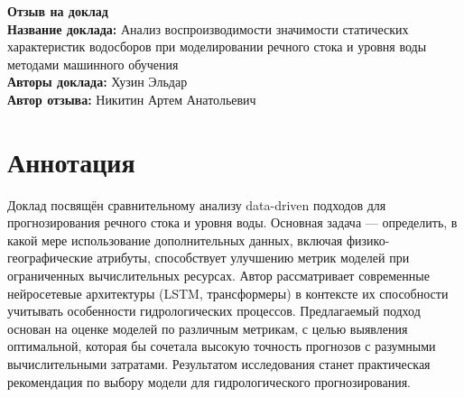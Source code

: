\documentclass[11pt]{article}
\begin{document}
\begin{center}
    {\Large \textbf{Отзыв на доклад}}\\[1em]
    {\large \textbf{Название доклада:} Анализ воспроизводимости значимости статических характеристик водосборов при моделировании речного стока и уровня воды методами машинного обучения}\\[0.5em]    {\large \textbf{Авторы доклада:} Хузин Эльдар}\\[0.5em]
    {\large \textbf{Автор отзыва:} Никитин Артем Анатольевич}\\[2em]
\end{center}

\section*{Аннотация}
Доклад посвящён сравнительному анализу data-driven подходов для прогнозирования речного стока и уровня воды. Основная задача ---
определить, в какой мере использование дополнительных данных, включая физико-географические атрибуты, способствует улучшению
метрик моделей при ограниченных вычислительных ресурсах. Автор рассматривает
современные нейросетевые архитектуры (LSTM, трансформеры) в контексте их способности учитывать особенности гидрологических
процессов. Предлагаемый подход основан на оценке моделей по различным метрикам, с целью выявления оптимальной,
которая бы сочетала высокую точность прогнозов с разумными вычислительными затратами. Результатом
исследования станет практическая рекомендация по выбору модели для гидрологического прогнозирования.
\end{document}
